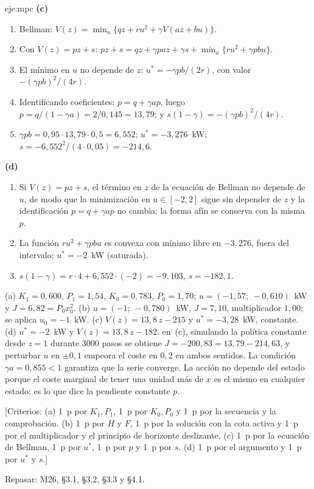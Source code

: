 \begin{solucion}{eje:mpc}
\noindent\textbf{(c)}
\begin{enumerate}[label=\arabic*.]
  \item Bellman: $V(z)=\min_u\bigl\{qz+ru^{2}+\gamma V(az+bu)\bigr\}$.
  \item Con $V(z)=pz+s$: $pz+s=qz+\gamma paz+\gamma s+\min_u\{ru^{2}+\gamma pbu\}$.
  \item El mínimo en $u$ no depende de $z$: $u^{\ast}=-\gamma pb/(2r)$, con valor $-(\gamma pb)^{2}/(4r)$.
  \item Identificando coeficientes: $p=q+\gamma ap$, luego $p=q/(1-\gamma a)=2/0{,}145=13{,}79$; y $s(1-\gamma)=-(\gamma pb)^{2}/(4r)$.
  \item $\gamma pb=0{,}95\cdot 13{,}79\cdot 0{,}5=6{,}552$; $u^{\ast}=-3{,}276$~kW; $s=-6{,}552^{2}/(4\cdot 0{,}05)=-214{,}6$.
\end{enumerate}

\noindent\textbf{(d)}
\begin{enumerate}[label=\arabic*.]
  \item Si $V(z)=pz+s$, el término en $z$ de la ecuación de Bellman no depende de $u$, de modo que la minimización en $u\in[-2,2]$ sigue sin depender de $z$ y la identificación $p=q+\gamma ap$ no cambia: la forma afín se conserva con la misma $p$.
  \item La función $ru^{2}+\gamma pbu$ es convexa con mínimo libre en $-3{,}276$, fuera del intervalo: $u^{\ast}=-2$~kW (saturada).
  \item $s(1-\gamma)=r\cdot 4+6{,}552\cdot(-2)=-9{,}103$, $s=-182{,}1$.
\end{enumerate}
\resultado (a) $K_1=0{,}600$, $P_1=1{,}54$, $K_0=0{,}783$, $P_0=1{,}70$; $u=(-1{,}57;\ -0{,}610)$~kW y $J=6{,}82=P_0x_0^{2}$. (b) $u=(-1;\ -0{,}780)$~kW, $J=7{,}10$, multiplicador $1{,}00$; se aplica $u_0=-1$~kW. (c) $V(z)=13{,}8\,z-215$ y $u^{\ast}=-3{,}28$~kW, constante. (d) $u^{\ast}=-2$~kW y $V(z)=13{,}8\,z-182$.
\comprobacion en~(c), simulando la política constante desde $z=1$ durante 3000 pasos se obtiene $J=-200{,}83=13{,}79-214{,}63$, y perturbar $u$ en $\pm0{,}1$ empeora el coste en $0{,}2$ en ambos sentidos. La condición $\gamma a=0{,}855<1$ garantiza que la serie converge. La acción no depende del estado porque el coste marginal de tener una unidad más de $x$ es el mismo en cualquier estado: es lo que dice la pendiente constante $p$.

[Criterios: (a) 1~p por $K_1,P_1$, 1~p por $K_0,P_0$ y 1~p por la secuencia y la comprobación. (b) 1~p por $H$ y $F$, 1~p por la solución con la cota activa y 1~p por el multiplicador y el principio de horizonte deslizante. (c) 1~p por la ecuación de Bellman, 1~p por $u^{\ast}$, 1~p por $p$ y 1~p por $s$. (d) 1~p por el argumento y 1~p por $u^{\ast}$ y $s$.]

Repasar: M26, §3.1, §3.2, §3.3 y §4.1.
\end{solucion}

